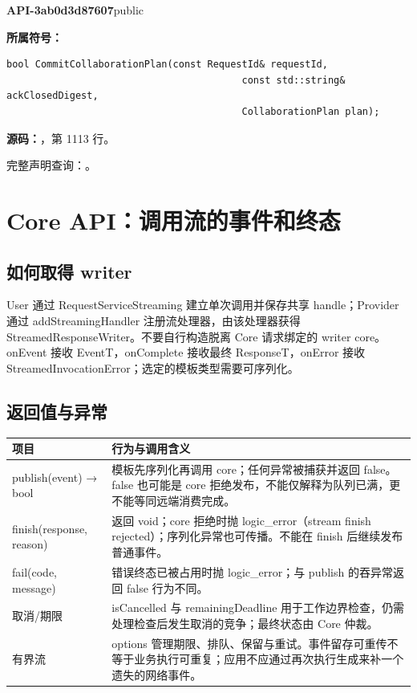 \textbf{API-3ab0d3d87607}\quad public\par
\textbf{所属符号：}\par
\begin{Verbatim}[fontsize=\footnotesize,breaklines,breakanywhere]
bool CommitCollaborationPlan(const RequestId& requestId,
                                         const std::string& ackClosedDigest,
                                         CollaborationPlan plan);
\end{Verbatim}
\textbf{源码：}，第 1113 行。\par

完整声明查询：。

\section{Core API：调用流的事件和终态}

\subsection{如何取得 writer}
User 通过 RequestServiceStreaming 建立单次调用并保存共享 handle；Provider 通过 addStreamingHandler 注册流处理器，由该处理器获得 StreamedResponseWriter。不要自行构造脱离 Core 请求绑定的 writer core。onEvent 接收 EventT，onComplete 接收最终 ResponseT，onError 接收 StreamedInvocationError；选定的模板类型需要可序列化。

\subsection{返回值与异常}

\begin{longtable}{@{}p{43mm}p{119mm}@{}}
\toprule
项目 & 行为与调用含义 \\
\midrule\endhead
publish(event) → bool & 模板先序列化再调用 core；任何异常被捕获并返回 false。false 也可能是 core 拒绝发布，不能仅解释为队列已满，更不能等同远端消费完成。 \\
finish(response, reason) & 返回 void；core 拒绝时抛 logic\_error（stream finish rejected）；序列化异常也可传播。不能在 finish 后继续发布普通事件。 \\
fail(code, message) & 错误终态已被占用时抛 logic\_error；与 publish 的吞异常返回 false 行为不同。 \\
取消/期限 & isCancelled 与 remainingDeadline 用于工作边界检查，仍需处理检查后发生取消的竞争；最终状态由 Core 仲裁。 \\
有界流 & options 管理期限、排队、保留与重试。事件留存可重传不等于业务执行可重复；应用不应通过再次执行生成来补一个遗失的网络事件。 \\
\bottomrule
\end{longtable}

